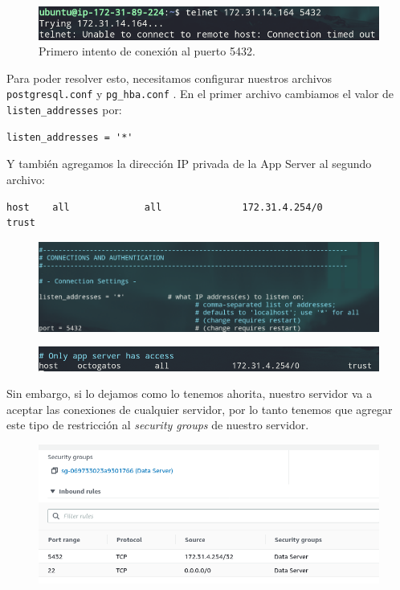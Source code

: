 \documentclass{article}
\newcommand{\ttt}[1]{%
\texttt{#1}%
}
\begin{document}
\begin{figure}[H]
  \centering
  \includegraphics[width=\textwidth]{DATASERVER/exhibitG}
  \caption{Primero intento de conexión al puerto 5432.}
  \label{fig:DATASERVER-G}
\end{figure}

Para poder resolver esto, necesitamos configurar nuestros 
archivos \ttt{postgresql.conf} y \ttt{pg\_hba.conf}. 
En el primer archivo cambiamos el valor de 
\ttt{listen\_addresses} por:

\begin{lstlisting}
listen_addresses = '*'
\end{lstlisting}

Y también agregamos la dirección IP privada de la App
Server  al segundo archivo:
\begin{lstlisting}
host    all             all              172.31.4.254/0                       trust
\end{lstlisting}

\begin{figure}[H]
  \centering
  \includegraphics[width=\textwidth]{DATASERVER/exhibitI}
  \label{fig:DATASERVER-I}
\end{figure}

\begin{figure}[H]
  \centering
  \includegraphics[width=\textwidth]{DATASERVER/exhibitJ}
  \label{fig:DATASERVER-J}
\end{figure}

Sin embargo, si lo dejamos como lo tenemos ahorita, nuestro 
servidor va a aceptar las conexiones de cualquier servidor,
por lo tanto tenemos que agregar este tipo de restricción 
al \textit{security groups} de nuestro servidor.

\begin{figure}[H]
  \centering
  \includegraphics[width=\textwidth]{DATASERVER/exhibitK}
  \label{fig:DATASERVER-K}
\end{figure}
\end{document}
